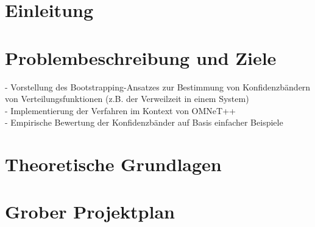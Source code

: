 \section{Einleitung}

\section{Problembeschreibung und Ziele}
- Vorstellung des Bootstrapping-Ansatzes zur Bestimmung von Konfidenzbändern von Verteilungsfunktionen (z.B. der Verweilzeit in einem System) \\
- Implementierung der Verfahren im Kontext von OMNeT++ \\
- Empirische Bewertung der Konfidenzbänder auf Basis einfacher Beispiele \\

\section{Theoretische Grundlagen}

\section{Grober Projektplan}
